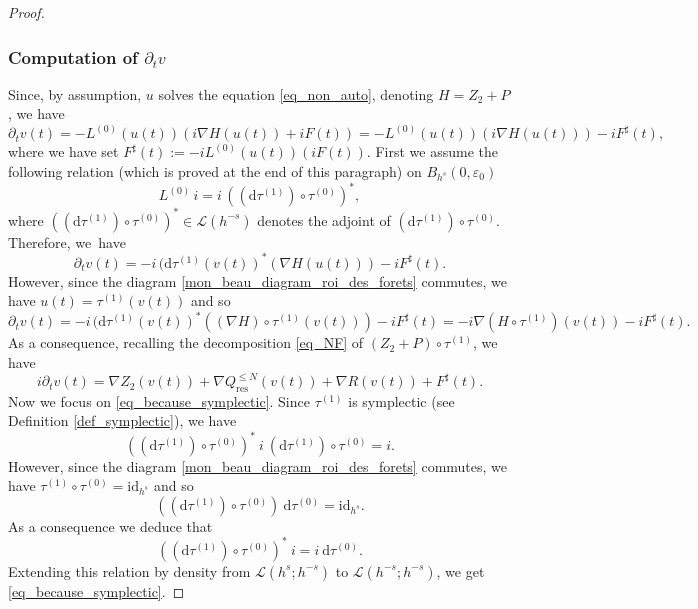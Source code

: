 \documentclass[JEP,XML,SOM,Unicode,NoEqCountersInSection,published]{cedram}
\theoremstyle{definition}
\begin{document}
\begin{proof}
\subsubsection*{Computation of $\partial_t v$}
Since, by assumption, $u$ solves the equation \eqref{eq_non_auto}, denoting $H=Z_2+P$, we have
\[
\partial_t v(t) = - L^{(0)}(u(t))(i \nabla H(u(t)) + iF(t)) = - L^{(0)}(u(t))(i \nabla H (u(t))) -i F^\sharp (t),
\]
where we have set $ F^\sharp (t):=-iL^{(0)}(u(t))(iF(t))$. First we assume the following relation (which is proved at the end of this paragraph) on $B_{h^s}(0,\varepsilon_0)$
\begin{equation}
\label{eq_because_symplectic}
L^{(0)} \, i= i \, ((\mathrm{d}\tau^{(1)}) \circ \tau^{(0)})^*,
\end{equation}
where $((\mathrm{d}\tau^{(1)}) \circ \tau^{(0)})^* \in \mathscr{L}(h^{-s})$ denotes the adjoint of $(\mathrm{d}\tau^{(1)}) \circ \tau^{(0)} $. Therefore, we~have
\[
\partial_t v(t) = -i \, (\mathrm{d}\tau^{(1)}(v(t))^*(\nabla H (u(t))) -i F^\sharp (t).
\]
However, since the diagram \eqref{mon_beau_diagram_roi_des_forets} commutes, we have $u(t) = \tau^{(1)} (v(t))$ and so
\[
\partial_t v(t) = -i \, (\mathrm{d}\tau^{(1)}(v(t))^*((\nabla H)\circ \tau^{(1)}(v(t))) -i F^\sharp (t) = -i \nabla (H\circ \tau^{(1)})(v(t)) -i F^\sharp (t).
\]
As a consequence, recalling the decomposition \eqref{eq_NF} of $(Z_2+P)\circ \tau^{(1)}$, we have
\begin{equation}
\label{eq_PDE_for_v}
i\partial_t v(t) = \nabla Z_2(v(t)) + \nabla Q^{\leq N}_{\mathrm{res}}(v(t)) + \nabla R(v(t)) + F^\sharp (t).
\end{equation}
Now we focus on \eqref{eq_because_symplectic}. Since $\tau^{(1)}$ is symplectic (see Definition \ref{def_symplectic}), we have
\[
((\mathrm{d}\tau^{(1)}) \circ \tau^{(0)})^* \ i \ (\mathrm{d}\tau^{(1)}) \circ \tau^{(0)} = i.
\]
However, since the diagram \eqref{mon_beau_diagram_roi_des_forets} commutes, we have $\tau^{(1)} \circ \tau^{(0)} = \mathrm{id}_{h^s}$ and so
\[
((\mathrm{d}\tau^{(1)}) \circ \tau^{(0)}) \ \mathrm{d} \tau^{(0)} = \mathrm{id}_{h^s}.
\]
As a consequence we deduce that
\[
((\mathrm{d}\tau^{(1)}) \circ \tau^{(0)})^* \ i = i \ \mathrm{d} \tau^{(0)}.
\]
Extending this relation by density from $\mathscr{L}(h^s;h^{-s})$ to $\mathscr{L}(h^{-s};h^{-s})$, we get \eqref{eq_because_symplectic}.


\end{proof}
\end{document}

